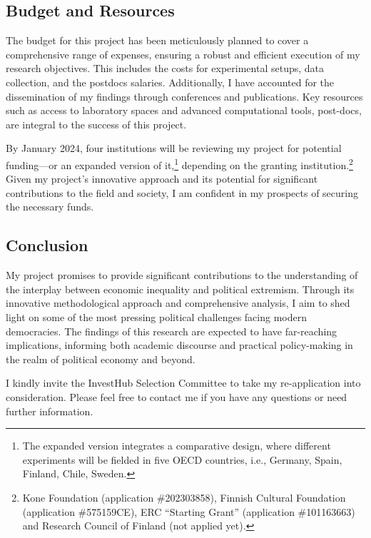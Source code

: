 \documentclass[letterpaper]{article}
\begin{document}
\vspace{-8mm}\subsection*{Budget and Resources}

The budget for this project has been meticulously planned to cover a comprehensive range of expenses, ensuring a robust and efficient execution of my research objectives. This includes the costs for experimental setups, data collection, and the postdocs salaries. Additionally, I have accounted for the dissemination of my findings through conferences and publications. Key resources such as access to laboratory spaces and advanced computational tools, post-docs, are integral to the success of this project. 

\vspace{2mm}By January 2024, four institutions will be reviewing my project for potential funding---or an expanded version of it,\footnote{The expanded version integrates a comparative design, where different experiments will be fielded in five OECD countries, i.e., Germany, Spain, Finland, Chile, Sweden.} depending on the granting institution.\footnote{Kone Foundation (application \#202303858), Finnish Cultural Foundation (application \#575159CE), ERC ``Starting Grant'' (application \#101163663) and Research Council of Finland (not applied yet).} Given my project's innovative approach and its potential for significant contributions to the field and society, I am confident in my prospects of securing the necessary funds.


\subsection*{Conclusion}

My project promises to provide significant contributions to the understanding of the interplay between economic inequality and political extremism. Through its innovative methodological approach and comprehensive analysis, I aim to shed light on some of the most pressing political challenges facing modern democracies. The findings of this research are expected to have far-reaching implications, informing both academic discourse and practical policy-making in the realm of political economy and beyond.

\vspace{2mm}I kindly invite the InvestHub Selection Committee to take my re-application into consideration. Please feel free to contact me if you have any questions or need further information.



\newpage
\printbibliography
\end{document}
